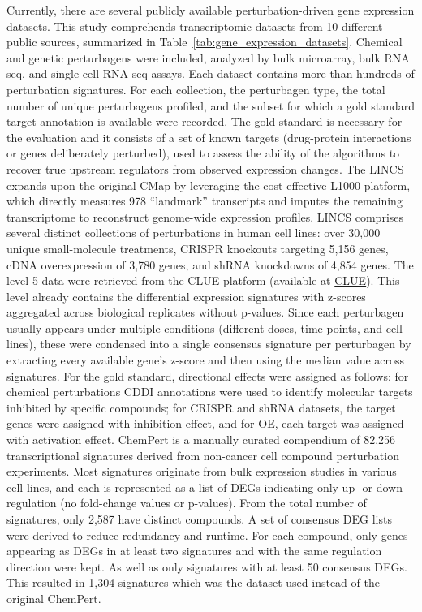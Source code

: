 Currently, there are several publicly available perturbation-driven gene expression datasets. This study comprehends transcriptomic datasets from 10 different public sources, summarized in Table~\ref{tab:gene_expression_datasets}. Chemical and genetic perturbagens were included, analyzed by bulk microarray, bulk RNA seq, and single-cell RNA seq assays. Each dataset contains more than hundreds of perturbation signatures. For each collection, the perturbagen type, the total number of unique perturbagens profiled, and the subset for which a gold standard target annotation is available were recorded. The gold standard is necessary for the evaluation and it consists of a set of known targets (drug-protein interactions or genes deliberately perturbed), used to assess the ability of the algorithms to recover true upstream regulators from observed expression changes. 
The LINCS expands upon the original CMap by leveraging the cost-effective L1000 platform, which directly measures 978 “landmark” transcripts and imputes the remaining transcriptome to reconstruct genome-wide expression profiles. LINCS comprises several distinct collections of perturbations in human cell lines: over 30,000 unique small-molecule treatments, CRISPR knockouts targeting 5,156 genes, cDNA overexpression of 3,780 genes, and shRNA knockdowns of 4,854 genes. The level 5 data were retrieved from the CLUE platform (available at \href{https://clue.io/data/CMap2020#LINCS2020}{CLUE}). This level already contains the differential expression signatures with z-scores aggregated across biological replicates without p-values. Since each perturbagen usually appears under multiple conditions (different doses, time points, and cell lines), these were condensed into a single consensus signature per perturbagen by extracting every available gene's z-score and then using the median value across signatures. For the gold standard, directional effects were assigned as follows: for chemical perturbations CDDI annotations were used to identify molecular targets inhibited by specific compounds; for CRISPR and shRNA datasets, the target genes were assigned with inhibition effect, and for OE, each target was assigned with activation effect.
ChemPert is a manually curated compendium of 82,256 transcriptional signatures derived from non-cancer cell compound perturbation experiments. Most signatures originate from bulk expression studies in various cell lines, and each is represented as a list of DEGs indicating only up- or down-regulation (no fold-change values or p-values). From the total number of signatures, only 2,587 have distinct compounds. A set of consensus DEG lists were derived to reduce redundancy and runtime. For each compound, only genes appearing as DEGs in at least two signatures and with the same regulation direction were kept. As well as only signatures with at least 50 consensus DEGs. This resulted in 1,304 signatures which was the dataset used instead of the original ChemPert.
